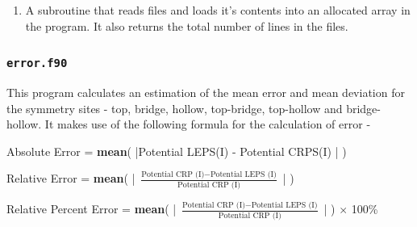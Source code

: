 \documentclass[12pt]{article}
\begin{document}
\begin{enumerate}
    \item A subroutine that reads files and loads it's contents into an allocated array in the program. It also returns the total number of lines in the files.
    \begin{table}[h!]\centering
    \caption{Subroutine 1 - read\_file}
    \end{table} 
\end{enumerate}

\subsubsection{\textbf{{\texttt{error.f90}}}}
This program calculates an estimation of the mean error and mean deviation for the symmetry sites - top, bridge, hollow, top-bridge, top-hollow and bridge-hollow. It makes use of the following formula for the calculation of error - 
\vspace{5mm}
\begin{center}
    Absolute Error = \textbf{mean}\Bigg( \Big|Potential LEPS(I) - Potential CRPS(I) \Big| \Bigg)
    
    Relative Error = \textbf{mean}\Bigg( \Big| $\frac{\text{Potential CRP (I)} - \text{Potential LEPS (I)}}{\text{Potential CRP (I)}}$ \Big| \Bigg)
    
    Relative Percent Error = \textbf{mean}\Bigg( \Big| $\frac{\text{Potential CRP (I)} - \text{Potential LEPS (I)}}{\text{Potential CRP (I)}}$ \Big| \Bigg) $\times$ 100\%
\end{center}

\vspace{5mm}
\end{document}
